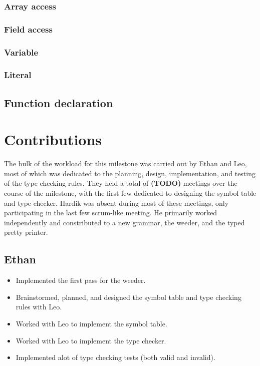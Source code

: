 \documentclass{article}
\begin{document}
\subsubsection*{Array access}
\subsubsection*{Field access}
\subsubsection*{Variable}
\subsubsection*{Literal}

\subsection*{Function declaration}

\section*{Contributions}

The bulk of the workload for this milestone was carried out by Ethan and Leo, most of which was dedicated to the planning, design, implementation, and testing of the type checking rules.
They held a total of \textbf{(TODO)} meetings over the course of the milestone, with the first few dedicated to designing the symbol table and type checker.
Hardik was absent during most of these meetings, only participating in the last few scrum-like meeting.
He primarily worked independently and constributed to a new grammar, the weeder, and the typed pretty printer.

\subsection*{Ethan}

\begin{itemize}
    \item Implemented the first pass for the weeder.
    \item Brainstormed, planned, and designed the symbol table and type checking rules with Leo.
    \item Worked with Leo to implement the symbol table.
    \item Worked with Leo to implement the type checker.
    \item Implemented alot of type checking tests (both valid and invalid).
\end{itemize}
\end{document}
